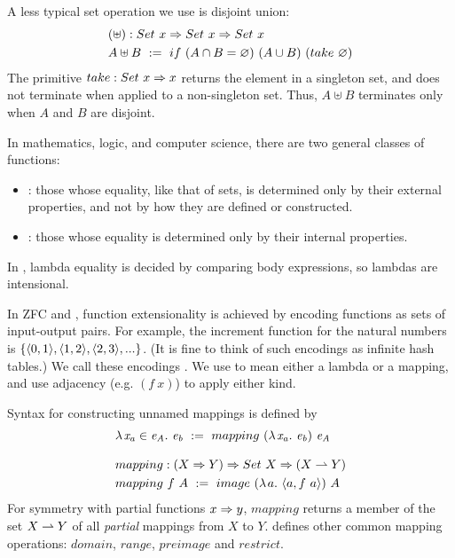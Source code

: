 A less typical set operation we use is disjoint union:
\begin{equation}
\begin{aligned}
	&(\uplus) : Set~x \Rightarrow Set~x \Rightarrow Set~x \\
	&A \uplus B \ := \ if~(A \cap B = \varnothing)~(A \cup B)~(take~\varnothing)
\end{aligned}
\end{equation}
The primitive $take : Set~x \Rightarrow x$ returns the element in a singleton set, and does not terminate when applied to a non-singleton set.
Thus, $A \uplus B$ terminates only when $A$ and $B$ are disjoint.

In mathematics, logic, and computer science, there are two general classes of functions:
\begin{itemize}
	\item {}: those whose equality, like that of sets, is determined only by their external properties, and not by how they are defined or constructed.
	\item {}: those whose equality is determined only by their internal properties.
\end{itemize}

In \lzfclang, lambda equality is decided by comparing body expressions, so lambdas are intensional.

In ZFC and \lzfclang, function extensionality is achieved by encoding functions as sets of input-output pairs.
For example, the increment function for the natural numbers is $\{{\langle{0,1}\rangle,\langle{1,2}\rangle,\langle{2,3}\rangle,...}\}$.
(It is fine to think of such encodings as infinite hash tables.)
We call these encodings .
We use  to mean either a lambda or a mapping, and use adjacency (e.g. $(f~x)$) to apply either kind.

Syntax for constructing unnamed mappings is defined by
\begin{align}
	&\fun{\mathit{x_a} \in \mathit{e_A}}{\mathit{e_b}} \ :=\ mapping~(\fun{\mathit{x_a}}\mathit{e_b})~\mathit{e_A} \\
\nonumber\\[-0.5\baselineskip]
	&\begin{aligned}
		&mapping : (X \tto Y) \tto Set~X \tto (X \pto Y) \\
		&mapping~f~A \ := \ image~(\fun{a}{\pair{a,f~a}})~A
	\end{aligned}
\end{align}
For symmetry with partial functions $x \Rightarrow y$, $mapping$ returns a member of the set $X \rightharpoonup Y$ of all \emph{partial} mappings from $X$ to $Y$.
 defines other common mapping operations: $domain$, $range$, $preimage$ and $restrict$.

